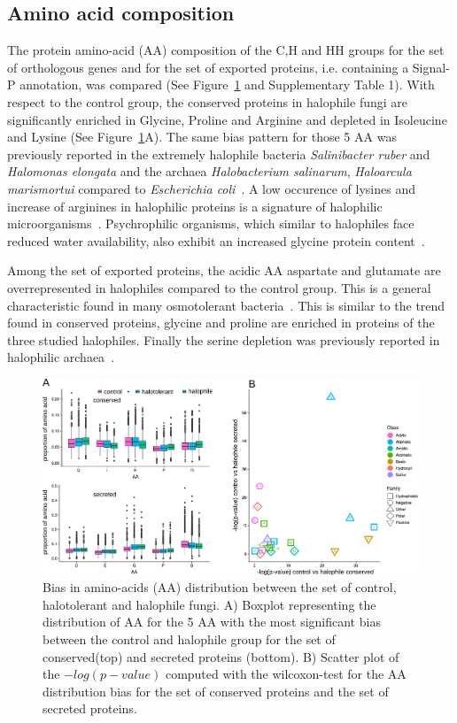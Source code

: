 \documentclass[jof,article,submit,moreauthors,pdftex,10pt,a4paper]{Definitions/mdpi}
\begin{document}
\subsection{Amino acid composition}
The protein amino-acid (AA) composition of the C,H and HH groups for the set of orthologous genes and for the set of exported proteins, i.e. containing a Signal-P annotation, was compared  (See Figure~\ref{fig:AABIAS} and Supplementary Table 1). With respect to the control group, the conserved proteins in halophile fungi are significantly enriched in Glycine, Proline and Arginine and depleted in Isoleucine and Lysine (See Figure~\ref{fig:AABIAS}A). The same bias pattern for those 5 AA was previously reported in the extremely halophile bacteria \textit{Salinibacter ruber} and \textit{Halomonas elongata} and the archaea \textit{Halobacterium salinarum}, \textit{Haloarcula marismortui} compared to \textit{Escherichia coli}~\cite{Oren2002}. A low occurence of lysines and increase of arginines in halophilic proteins is a signature of halophilic microorganisms~\cite{Paul2008,Tadeo2009}. Psychrophilic organisms, which similar to halophiles face reduced water availability, also exhibit an increased glycine protein content~\cite{De_Maayer2014}. 

Among the set of exported proteins, the acidic AA aspartate and glutamate are overrepresented in halophiles compared to the control group. This is a general characteristic found in many osmotolerant bacteria~\cite{Fukuchi2003, Paul2008}. This is similar to the trend found in conserved proteins, glycine and proline are enriched in proteins of the three studied halophiles. Finally the serine depletion was previously reported in halophilic archaea~\cite{Tadeo2009}.

\begin{figure}
    \centering
    \includegraphics[width=\linewidth]{AAAnalysis.pdf}
    \caption{\label{fig:AABIAS} Bias in amino-acids (AA) distribution between the set of control, halotolerant and halophile fungi. A) Boxplot representing the distribution of AA for the 5 AA with the most significant bias between the control and halophile group for the set of conserved(top) and secreted proteins (bottom). B) Scatter plot of the $-log(p-value)$ computed with the wilcoxon-test for the AA distribution bias for the set of conserved proteins and the set of secreted proteins. }
\end{figure}
\end{document}
